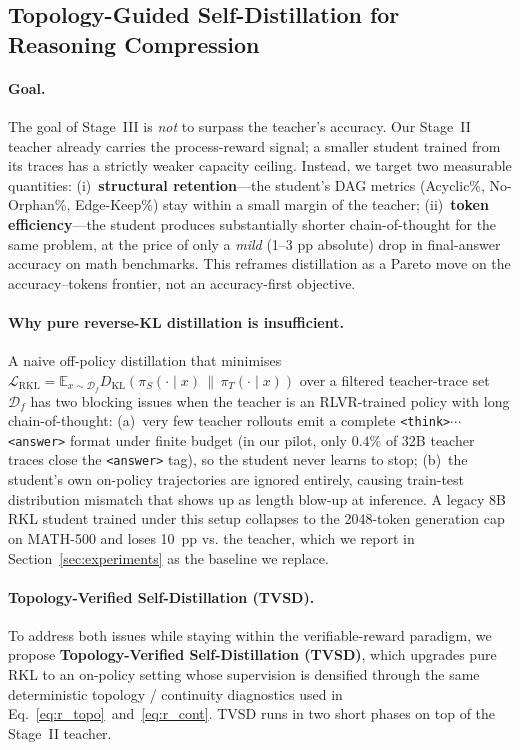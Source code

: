 \subsection{Topology-Guided Self-Distillation for Reasoning Compression}
\label{sec:compression}
\label{sec:tvsd}

\paragraph{Goal.}
The goal of Stage~III is \emph{not} to surpass the teacher's accuracy.
Our Stage~II teacher already carries the process-reward signal; a smaller
student trained from its traces has a strictly weaker capacity ceiling.
Instead, we target two measurable quantities:
(i)~\textbf{structural retention}---the student's DAG metrics
(Acyclic\%, No-Orphan\%, Edge-Keep\%) stay within a small margin of the teacher;
(ii)~\textbf{token efficiency}---the student produces substantially shorter
chain-of-thought for the same problem, at the price of only a \emph{mild}
(1--3 pp absolute) drop in final-answer accuracy on math benchmarks.
This reframes distillation as a Pareto move on the accuracy--tokens frontier,
not an accuracy-first objective.

\paragraph{Why pure reverse-KL distillation is insufficient.}
A naive off-policy distillation that minimises
$\mathcal{L}_{\mathrm{RKL}} = \mathbb{E}_{x\sim\mathcal{D}_f}
D_{\mathrm{KL}}(\pi_S(\cdot\!\mid\!x)\,\|\,\pi_T(\cdot\!\mid\!x))$
over a filtered teacher-trace set $\mathcal{D}_f$ has two blocking issues
when the teacher is an RLVR-trained policy with long chain-of-thought:
(a)~very few teacher rollouts emit a complete \texttt{<think>$\cdots$<answer>}
format under finite budget (in our pilot, only $0.4\%$ of 32B teacher traces
close the \texttt{<answer>} tag), so the student never learns to stop;
(b)~the student's own on-policy trajectories are ignored entirely, causing
train-test distribution mismatch that shows up as length blow-up at inference.
A legacy 8B RKL student trained under this setup collapses to the
2048-token generation cap on MATH-500 and loses 10~pp vs. the teacher,
which we report in Section~\ref{sec:experiments} as the baseline we replace.

\paragraph{Topology-Verified Self-Distillation (TVSD).}
To address both issues while staying within the verifiable-reward paradigm,
we propose \textbf{Topology-Verified Self-Distillation (TVSD)}, which
upgrades pure RKL to an on-policy setting whose supervision is densified
through the same deterministic topology / continuity diagnostics used in
Eq.~\ref{eq:r_topo}~and~\ref{eq:r_cont}. TVSD runs in two short phases
on top of the Stage~II teacher.

